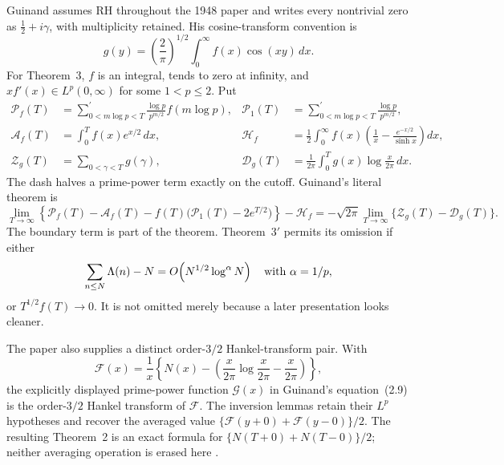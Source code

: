 Guinand assumes RH throughout the 1948 paper and writes every nontrivial zero as
$\tfrac12+i\gamma$, with multiplicity retained.  His cosine-transform convention is
\cite[pp.~107--108, eq.~(1.1)]{guinand1948}
\begin{equation}
 g(y)=\left(\frac2\pi\right)^{1/2}
       \int_0^\infty f(x)\cos(xy)\,dx.
 \label{eq:guinand-cosine}
\end{equation}
For Theorem~3, $f$ is an integral, tends to zero at infinity, and
$xf'(x)\in L^p(0,\infty)$ for some $1<p\leq2$.  Put
\begin{align*}
 \mathcal P_f(T)&=\sum_{0<m\log p<T}^{\prime}
   \frac{\log p}{p^{m/2}}f(m\log p),
 &\mathcal P_1(T)&=\sum_{0<m\log p<T}^{\prime}\frac{\log p}{p^{m/2}},\\
 \mathcal A_f(T)&=\int_0^T f(x)e^{x/2}\,dx,
 &\mathcal H_f&=\frac12\int_0^\infty
 f(x)\left(\frac1x-\frac{e^{-x/2}}{\sinh x}\right)dx,\\
 \mathcal Z_g(T)&=\sum_{0<\gamma<T}g(\gamma),
 &\mathcal D_g(T)&=\frac1{2\pi}\int_0^Tg(x)\log\frac{x}{2\pi}\,dx.
\end{align*}
The dash halves a prime-power term exactly on the cutoff.  Guinand's literal theorem is
\cite[pp.~112--115, Thms.~3 and~3$'$]{guinand1948}
\begin{equation}
 \lim_{T\to\infty}\!\left\{
 \mathcal P_f(T)-\mathcal A_f(T)
 -f(T)\bigl(\mathcal P_1(T)-2e^{T/2}\bigr)\right\}
 -\mathcal H_f
 =-\sqrt{2\pi}\lim_{T\to\infty}
 \bigl\{\mathcal Z_g(T)-\mathcal D_g(T)\bigr\}.
 \label{eq:guinand-theorem-3}
\end{equation}
The boundary term is part of the theorem.  Theorem~$3'$ permits its omission if either
\[
 \sum_{n\leq N}\Lambda(n)-N=O\!\left(N^{1/2}\log^\alpha N\right)
 \quad\hbox{with }\alpha=1/p,
\]
or $T^{1/2}f(T)\to0$.  It is not omitted merely because a later presentation looks cleaner.

The paper also supplies a distinct order-$3/2$ Hankel-transform pair.  With
\[
 \mathcal F(x)=\frac1x\left\{N(x)-\left(\frac{x}{2\pi}\log\frac{x}{2\pi}
 -\frac{x}{2\pi}\right)\right\},
\]
the explicitly displayed prime-power function $\mathcal G(x)$ in Guinand's equation~(2.9)
is the order-$3/2$ Hankel transform of $\mathcal F$.  The inversion lemmas retain their
$L^p$ hypotheses and recover the averaged value
$\{\mathcal F(y+0)+\mathcal F(y-0)\}/2$.  The resulting Theorem~2 is an exact formula for
$\{N(T+0)+N(T-0)\}/2$; neither averaging operation is erased here
\cite[pp.~108--112, Thms.~1--2]{guinand1948}.

